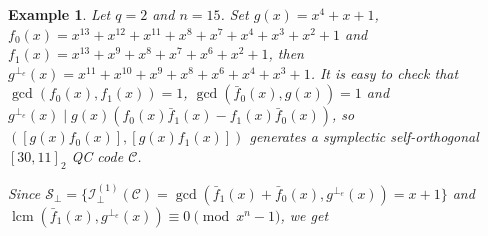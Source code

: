 \documentclass[journal]{IEEEtran}
\newtheorem{example}{Example}
\begin{document}
\begin{example}\label{good_Ex2}
	Let $q=2$ and $n=15$. Set $g(x)=x^4 + x + 1$, $f_0(x)=x^{13} + x^{12} + x^{11} + x^8 + x^7 + x^4 + x^3 + x^2 + 1$ and $f_1(x)=x^{13} + x^9 + x^8 + x^7 + x^6 + x^2 + 1$, then $g^{\perp_e}(x)=x^{11} + x^{10} + x^9 + x^8 + x^6 + x^4 + x^3 + 1$. It is easy to check that $\gcd(f_0(x),f_1(x))=1$, $\gcd(\bar{f}_0(x),g(x))=1$ and 
 $g^{\perp_e}(x) \mid g(x)(f_{0}(x) \bar{f}_{1}(x)-f_{1}(x) \bar{f}_{0}(x))$, so $(\left[g(x)f_0(x)\right],\left[g(x)f_1(x)\right])$ generates a symplectic self-orthogonal $\left[30,11\right]_2$ QC code $\mathscr{C}$.
 

Since $\mathcal{S}_{\perp} =\{\mathcal{I}^{(1)}_{\perp}(\mathscr{C})=\gcd(\bar{f}_1(x)+ \bar{f}_0(x),g^{\perp_{e}}(x))= x + 1\}$ and $\operatorname{lcm}(\bar{f}_1(x),g^{\perp_e}(x))\equiv 0 \pmod{x^n-1}$, we get



\end{example}
\end{document}

